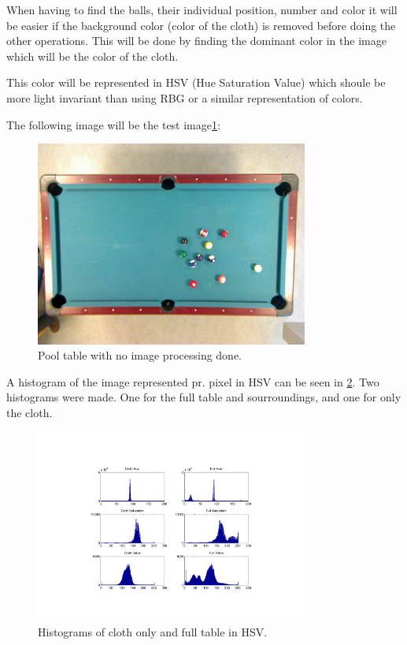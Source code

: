 When having to find the balls, their individual position, number and color it will be easier if the background color (color of the cloth) is removed before doing the other operations. This will be done by finding the dominant color in the image which will be the color of the cloth.


This color will be represented in HSV (Hue Saturation Value) which shoule be more light invariant than using RBG or a similar representation of colors.

The following image will be the test image\ref{fig:poolnofilter}:
\begin{figure}[H]
\begin{center}
\leavevmode
\includegraphics[width=0.8\textwidth]{images/table-no-filters.jpg}
\end{center}
\caption{Pool table with no image processing done.}
\label{fig:poolnofilter}
\end{figure}

A histogram of the image represented pr. pixel in HSV can be seen in \ref{fig:histpoolhsv}. Two histograms were made. One for the full table and sourroundings, and one for only the cloth.
\begin{figure}[H]
\begin{center}
\leavevmode
\includegraphics[width=0.8\textwidth]{images/hist2.pdf}
\end{center}
\caption{Histograms of cloth only and full table in HSV.}
\label{fig:histpoolhsv}
\end{figure}

